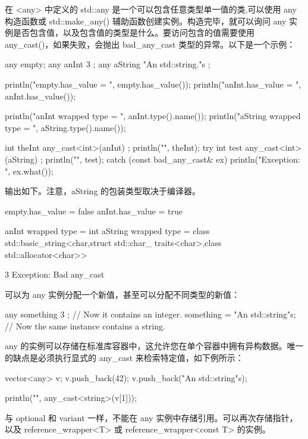 在 <any> 中定义的 std::any 是一个可以包含任意类型单一值的类,可以使用 any 构造函数或 std::make\_any() 辅助函数创建实例。构造完毕，就可以询问 any 实例是否包含值，以及包含值的类型是什么。要访问包含的值需要使用 any\_cast()，如果失败，会抛出 bad\_any\_cast 类型的异常。以下是一个示例：

\begin{cpp}
any empty;
any anInt { 3 };
any aString { "An std::string."s };

println("empty.has_value = {}", empty.has_value());
println("anInt.has_value = {}\n", anInt.has_value());

println("anInt wrapped type = {}", anInt.type().name());
println("aString wrapped type = {}\n", aString.type().name());

int theInt { any_cast<int>(anInt) };
println("{}", theInt);
try {
    int test { any_cast<int>(aString) };
    println("{}", test);
} catch (const bad_any_cast& ex) {
    println("Exception: {}", ex.what());
}
\end{cpp}

输出如下。注意，aString 的包装类型取决于编译器。

\begin{shell}
empty.has_value = false
anInt.has_value = true

anInt wrapped type = int
aString wrapped type = class std::basic_string<char,struct std::char_
traits<char>,class std::allocator<char>>

3
Exception: Bad any_cast
\end{shell}

可以为 any 实例分配一个新值，甚至可以分配不同类型的新值：

\begin{cpp}
any something { 3 }; // Now it contains an integer.
something = "An std::string"s; // Now the same instance contains a string.
\end{cpp}

any 的实例可以存储在标准库容器中，这允许您在单个容器中拥有异构数据。唯一的缺点是必须执行显式的 any\_cast 来检索特定值，如下例所示：

\begin{cpp}
vector<any> v;
v.push_back(42);
v.push_back("An std::string"s);

println("{}", any_cast<string>(v[1]));
\end{cpp}

与 optional 和 variant 一样，不能在 any 实例中存储引用。可以再次存储指针，以及 reference\_wrapper<T> 或 reference\_wrapper<const T> 的实例。




